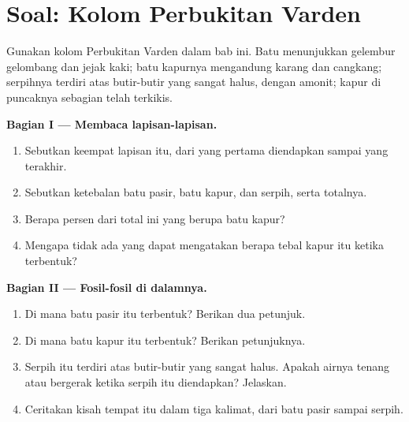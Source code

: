 \section{Soal: Kolom Perbukitan Varden}

\begin{problem}
\label{pb:g7:sediments-and-fossils:1}
Gunakan kolom Perbukitan Varden dalam bab ini. Batu  menunjukkan
gelembur gelombang dan jejak kaki; batu kapurnya mengandung karang dan
cangkang; serpihnya terdiri atas butir-butir yang sangat halus, dengan
amonit; kapur di puncaknya sebagian telah terkikis.

\medskip
\noindent\textbf{Bagian I --- Membaca lapisan-lapisan.}\par\nopagebreak
\begin{enumerate}[beginpenalty=10000]
  \item Sebutkan keempat lapisan itu, dari yang pertama diendapkan sampai
        yang terakhir.
  \item Sebutkan ketebalan batu pasir, batu kapur, dan serpih, serta
        totalnya.
  \item Berapa persen dari total ini yang berupa batu kapur?
  \item Mengapa tidak ada yang dapat mengatakan berapa tebal kapur itu
        ketika terbentuk?
\end{enumerate}

\medskip
\noindent\textbf{Bagian II --- Fosil-fosil di dalamnya.}\par\nopagebreak
\begin{enumerate}[resume, beginpenalty=10000]
  \item Di mana batu pasir itu terbentuk? Berikan dua petunjuk.
  \item Di mana batu kapur itu terbentuk? Berikan petunjuknya.
  \item Serpih itu terdiri atas butir-butir yang sangat halus. Apakah airnya
        tenang atau bergerak ketika serpih itu diendapkan? Jelaskan.
  \item Ceritakan kisah tempat itu dalam tiga kalimat, dari batu pasir
        sampai serpih.
\end{enumerate}


\end{problem}
